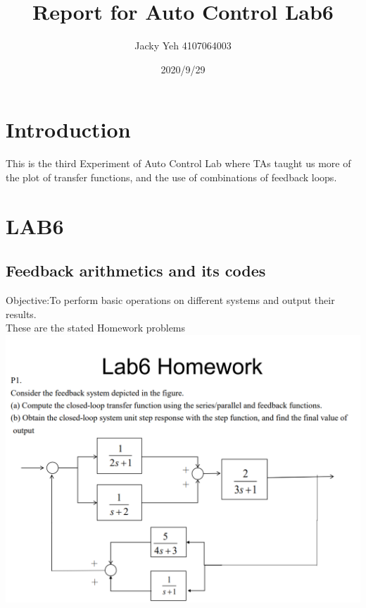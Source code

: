 \documentclass[12pt]{article}
\title{Report for Auto Control Lab6}
\date{2020/9/29}
\author{Jacky Yeh 4107064003}
\begin{document}
\begin{titlepage}

\maketitle
\end{titlepage}


\section{Introduction}
This is the third Experiment of Auto Control Lab where TAs taught us more of the plot of transfer functions, and the use of combinations of feedback loops.\\

\section{LAB6}
\subsection{Feedback arithmetics and its codes}
Objective:To perform basic operations on different systems and output their results.\\

These are the stated Homework problems\\
\includegraphics[scale=0.5]{../Lab6/HW_code1.png} \\
\end{document}
